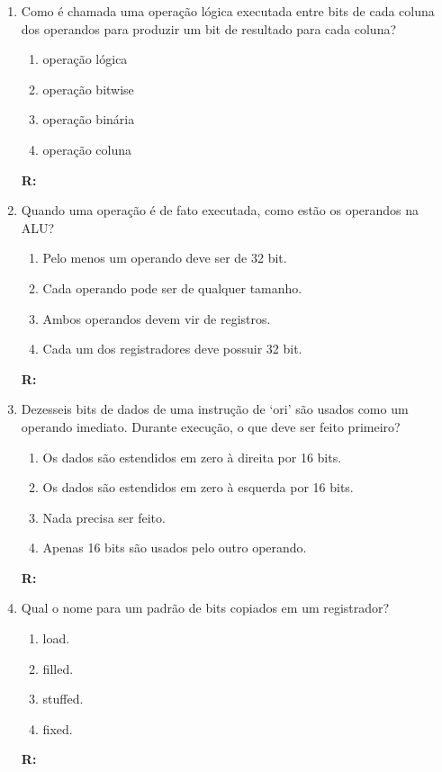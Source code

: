 \documentclass[a4paper,11pt]{article}
\begin{document}
\begin{enumerate}
    \item{Como é chamada uma operação lógica executada entre bits de cada coluna dos operandos para
            produzir um bit de resultado para cada coluna?}
        \begin{enumerate}
            \item{operação lógica}
            \item{operação bitwise}
            \item{operação binária}
            \item{operação coluna}
        \end{enumerate}
        \textbf{R: }

    \item{Quando uma operação é de fato executada, como estão os operandos na ALU?}
        \begin{enumerate}
            \item{Pelo menos um operando deve ser de 32 bit.}
            \item{Cada operando pode ser de qualquer tamanho.}
            \item{Ambos operandos devem vir de registros.}
            \item{Cada um dos registradores deve possuir 32 bit.}
        \end{enumerate}
        \textbf{R:}

    \item{Dezesseis bits de dados de uma instrução de `ori' são usados como um operando imediato. Durante
            execução, o que deve ser feito primeiro?}
        \begin{enumerate}
            \item{Os dados são estendidos em zero à direita por 16 bits.}
            \item{Os dados são estendidos em zero à esquerda por 16 bits.}
            \item{Nada precisa ser feito.}
            \item{Apenas 16 bits são usados pelo outro operando.}
        \end{enumerate}
        \textbf{R: }

    \item{Qual o nome para um padrão de bits copiados em um registrador?}
        \begin{enumerate}
            \item{load.}
            \item{filled.}
            \item{stuffed.}
            \item{fixed.}
        \end{enumerate}
        \textbf{R: }


\end{enumerate}
\end{document}
